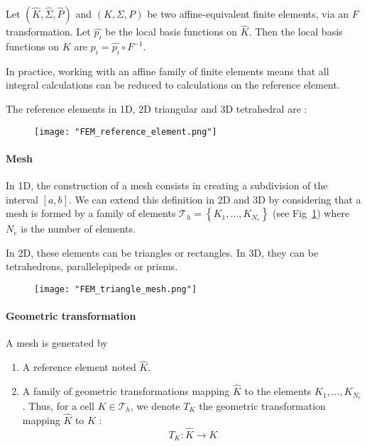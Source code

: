 	\begin{Rem}
		Let $(\hat{K},\hat{\Sigma},\hat{P})$ and $(K,\Sigma,P)$ be two affine-equivalent finite elements, via an $F$ transformation. Let $\hat{p_i}$ be the local basis functions on $\hat{K}$. Then the local basis functions on $K$ are $p_i=\hat{p_i}\circ F^{-1}$.
	\end{Rem}
		
	\begin{Rem}
		In practice, working with an affine family of finite elements means that all integral calculations can be reduced to calculations on the reference element. 
		
		The reference elements in 1D, 2D triangular and 3D tetrahedral are :
		\begin{figure}[H]
			\centering
			\texttt{[image: "FEM\_reference\_element.png"]}
		\end{figure}
	\end{Rem}

\paragraph{Mesh}

In 1D, the construction of a mesh consists in creating a subdivision of the interval $[a,b]$. We can extend this definition in 2D and 3D by considering that a mesh is formed by a family of elements $\mathcal{T}_h = \left\{K_1,\dots,K_{N_e}\right\}$ (see Fig~\ref{triangle_mesh}) where $N_e$ is the number of elements. 

In 2D, these elements can be triangles or rectangles. In 3D, they can be tetrahedrons, parallelepipeds or prisms.

\begin{figure}[H]
	\centering
	\texttt{[image: "FEM\_triangle\_mesh.png"]}
	\label{triangle_mesh}
\end{figure}

\paragraph{Geometric transformation}

A mesh is generated by
\begin{enumerate}[label=\textbullet]
	\item A reference element noted $\hat{K}$.
	\item A family of geometric transformations mapping $\hat{K}$ to the elements $K_1,\dots,K_{N_e}$. Thus, for a cell $K\in\mathcal{T}_h$, we denote $T_K$ the geometric transformation mapping $\hat{K}$ to $K$ :
	\begin{equation*}
	T_K : \hat{K}\rightarrow K
	\end{equation*}
\end{enumerate}

